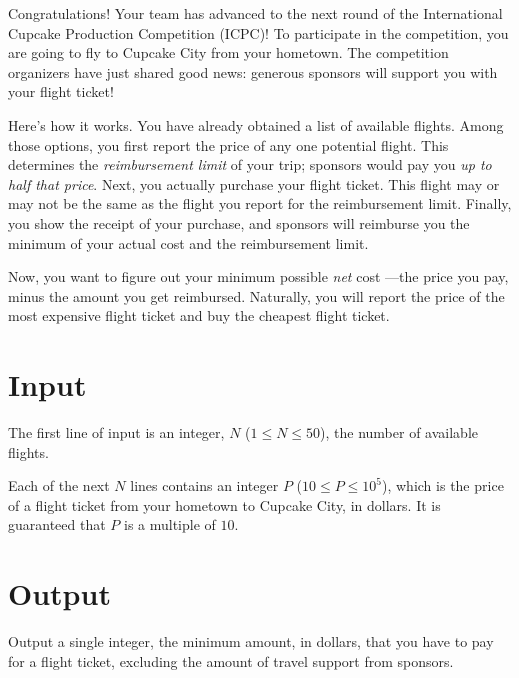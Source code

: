 

Congratulations!
Your team has advanced to the next round of the International Cupcake Production Competition (ICPC)!
%
To participate in the competition, you are going to fly to Cupcake City from your hometown.
The competition organizers have just shared good news:
generous sponsors will support you with your flight ticket!

Here's how it works.
%
You have already obtained a list of available flights.
%
Among those options, you first report the price of any one potential flight.
This determines the \emph{reimbursement limit} of your trip; sponsors would pay you \emph{up to half that price}.
%
Next, you actually purchase your flight ticket.
This flight may or may not be the same as the flight you report for the reimbursement limit.
%
Finally, you show the receipt of your purchase,
and sponsors will reimburse you the minimum of your actual cost and the reimbursement limit.

Now, you want to figure out your minimum possible \emph{net} cost%
---the price you pay, minus the amount you get reimbursed.
%
Naturally, you will report the price of the most expensive flight ticket and buy the cheapest flight ticket.

\section*{Input}

The first line of input is an integer, $N$ ($1 \leq N \leq 50$), the number of available flights.

Each of the next $N$ lines contains an integer $P$ ($10 \leq P \leq 10^5$),
which is the price of a flight ticket from your hometown to Cupcake City, in dollars.
It is guaranteed that $P$ is a multiple of $10$.

\section*{Output}

Output a single integer,
the minimum amount, in dollars, that you have to pay for a flight ticket,
excluding the amount of travel support from sponsors.
